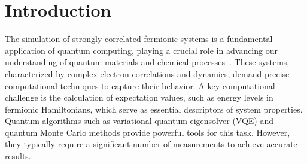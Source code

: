 \documentclass[showpacs,onecolumn,aps,prx,long bibliography,superscriptaddress,notitlepage]{revtex4-1}
\begin{document}
\section{Introduction}

The simulation of strongly correlated fermionic systems is a fundamental application of quantum computing, playing a crucial role in advancing our understanding of quantum materials and chemical processes~\cite{lieb1961two, si1996kosterlitz,aspuru2005simulated,whitfield2011simulation,auerbach2012interacting,cao2019quantum}.
These systems, characterized by complex electron correlations and dynamics, demand precise computational techniques to capture their behavior. 
A key computational challenge is the calculation of expectation values, such as energy levels in fermionic Hamiltonians, which serve as essential descriptors of system properties. 
Quantum algorithms such as variational quantum eigensolver (VQE)\cite{tilly2022variational, cerezo2021variational} and quantum Monte Carlo methods\cite{foulkes2001quantum, carlson2015quantum} provide powerful tools for this task. However, they typically require a significant number of measurements to achieve accurate results.
\end{document}
